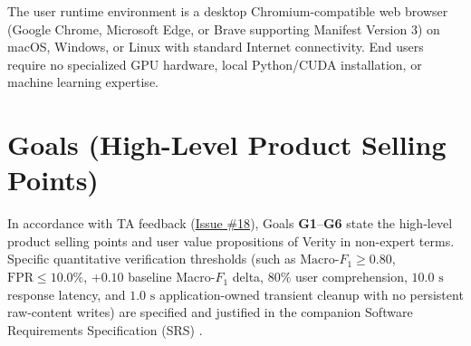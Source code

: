 \documentclass[11pt]{article}
\begin{document}
The user runtime environment is a desktop Chromium-compatible web browser (Google Chrome, Microsoft Edge, or Brave supporting Manifest Version 3) on macOS, Windows, or Linux with standard Internet connectivity. End users require no specialized GPU hardware, local Python/CUDA installation, or machine learning expertise.

\section{Goals (High-Level Product Selling Points)}

In accordance with TA feedback (\href{https://github.com/richy1337/Verity/issues/18}{Issue \#18}), Goals \textbf{G1}--\textbf{G6} state the high-level product selling points and user value propositions of Verity in non-expert terms. Specific quantitative verification thresholds (such as $\text{Macro-}F_1 \ge 0.80$, $\text{FPR} \le 10.0\%$, $+0.10$ baseline Macro-$F_1$ delta, $80\%$ user comprehension, $10.0\text{ s}$ response latency, and $1.0\text{ s}$ application-owned transient cleanup with no persistent raw-content writes) are specified and justified in the companion Software Requirements Specification (SRS) \cite{VeritySRS2026}.
\end{document}
